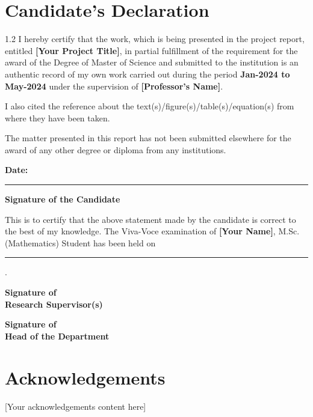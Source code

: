 \documentclass[12pt,a4paper]{report}
\begin{document}
\chapter*{Candidate's Declaration}
\begin{spacing}{1.2}
I hereby certify that the work, which is being presented in the project report, entitled \textbf{[Your Project Title]}, in partial fulfillment of the requirement for the award of the Degree of Master of Science and submitted to the institution is an authentic record of my own work carried out during the period \textbf{Jan-2024 to May-2024} under the supervision of \textbf{[Professor's Name]}.

I also cited the reference about the text(s)/figure(s)/table(s)/equation(s) from where they have been taken.

The matter presented in this report has not been submitted elsewhere for the award of any other degree or diploma from any institutions.

\vspace{1cm}

\textbf{Date:} \rule{3cm}{.15mm} \hspace{5cm} \textbf{Signature of the Candidate}

\vspace{2cm}

This is to certify that the above statement made by the candidate is correct to the best of my knowledge. The Viva-Voce examination of \textbf{[Your Name]}, M.Sc. (Mathematics) Student has been held on \rule{5cm}{.15mm}.

\vspace{3cm}

\begin{minipage}[t]{0.45\textwidth}
\centering
\textbf{Signature of \\Research Supervisor(s)}
\end{minipage}%
\hfill
\begin{minipage}[t]{0.45\textwidth}
\centering
\textbf{Signature of \\Head of the Department}
\end{minipage}

\end{spacing}
\clearpage

\chapter*{Acknowledgements}
[Your acknowledgements content here]
\clearpage
\end{document}
